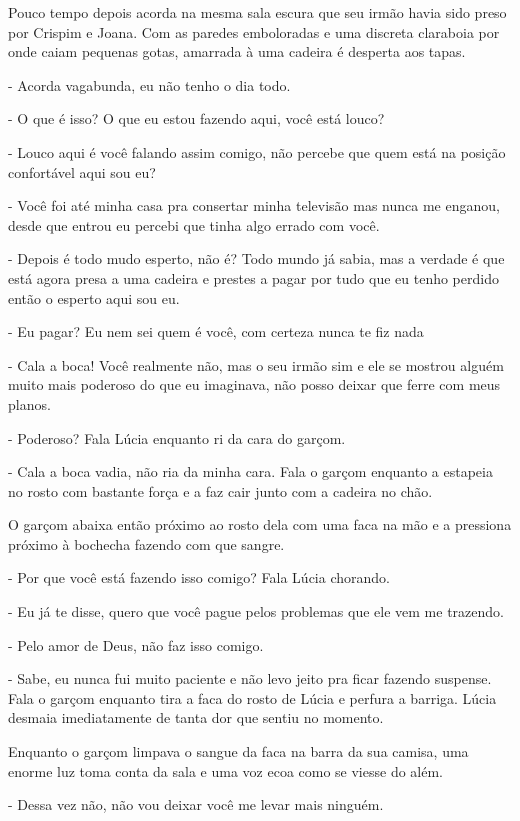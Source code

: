 Pouco tempo depois acorda na mesma sala escura que seu irmão havia sido preso por Crispim e Joana. Com as paredes emboloradas e uma discreta claraboia por onde caiam pequenas gotas, amarrada à uma cadeira é desperta aos tapas.

- Acorda vagabunda, eu não tenho o dia todo.

- O que é isso? O que eu estou fazendo aqui, você está louco?

- Louco aqui é você falando assim comigo, não percebe que quem está na posição confortável aqui sou eu?

- Você foi até minha casa pra consertar minha televisão mas nunca me enganou, desde que entrou eu percebi que tinha algo errado com você.

- Depois é todo mudo esperto, não é? Todo mundo já sabia, mas a verdade é que está agora presa a uma cadeira e prestes a pagar por tudo que eu tenho perdido então o esperto aqui sou eu.

- Eu pagar? Eu nem sei quem é você, com certeza nunca te fiz nada

- Cala a boca! Você realmente não, mas o seu irmão sim e ele se mostrou alguém muito mais poderoso do que eu imaginava, não posso deixar que ferre com meus planos.

- Poderoso? Fala Lúcia enquanto ri da cara do garçom.

- Cala a boca vadia, não ria da minha cara. Fala o garçom enquanto a estapeia no rosto com bastante força e a faz cair junto com a cadeira no chão.

O garçom abaixa então próximo ao rosto dela com uma faca na mão e a pressiona próximo à bochecha fazendo com que sangre.

- Por que você está fazendo isso comigo? Fala Lúcia chorando.

- Eu já te disse, quero que você pague pelos problemas que ele vem me trazendo.

- Pelo amor de Deus, não faz isso comigo.

- Sabe, eu nunca fui muito paciente e não levo jeito pra ficar fazendo suspense. Fala o garçom enquanto tira a faca do rosto de Lúcia e perfura a barriga. Lúcia desmaia imediatamente de tanta dor que sentiu no momento.

Enquanto o garçom limpava o sangue da faca na barra da sua camisa, uma enorme luz toma conta da sala e uma voz ecoa como se viesse do além.

- Dessa vez não, não vou deixar você me levar mais ninguém.


